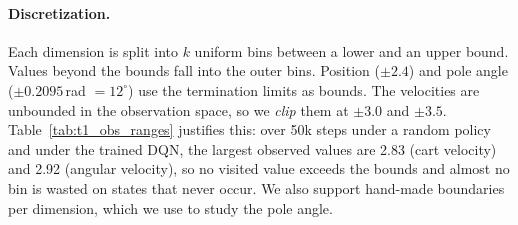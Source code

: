 \paragraph{Discretization.} Each dimension is split into $k$ uniform bins between a lower and an upper
bound. Values beyond the bounds fall into the outer bins. Position ($\pm2.4$) and pole angle
($\pm0.2095$\,rad $=12^\circ$) use the termination limits as bounds. The velocities are unbounded in the
observation space, so we \emph{clip} them at $\pm3.0$ and $\pm3.5$. Table~\ref{tab:t1_obs_ranges}
justifies this: over 50k steps under a random policy and under the trained DQN, the largest observed
values are 2.83 (cart velocity) and 2.92 (angular velocity), so no visited value exceeds the bounds and
almost no bin is wasted on states that never occur. We also support hand-made boundaries per dimension,
which we use to study the pole angle.

\begin{table}[t]
\centering\small
\caption{Hyper-parameters. Only the switch named in each configuration changes.}
\label{tab:hparams}
\end{table}

